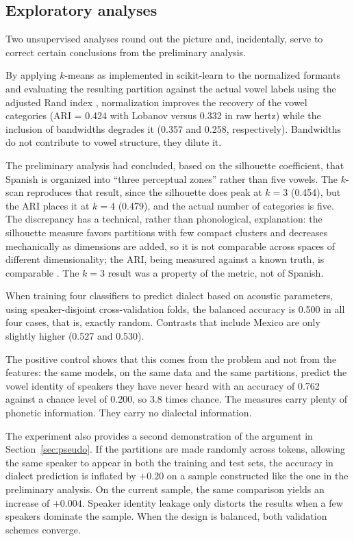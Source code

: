 \documentclass[11pt]{article}
\begin{document}
\subsection{Exploratory analyses}

Two unsupervised analyses round out the picture and, incidentally, serve to
correct certain conclusions from the preliminary analysis.

By applying $k$-means as implemented in scikit-learn \citep{pedregosa2011} to the
normalized formants and evaluating the resulting partition against the actual
vowel labels using the adjusted Rand index \citep{hubert1985}, normalization
improves the recovery of the vowel categories (ARI = 0.424 with Lobanov versus
0.332 in raw hertz) while the inclusion of bandwidths degrades it (0.357 and
0.258, respectively). Bandwidths do not contribute to vowel structure, they
dilute it.

The preliminary analysis had concluded, based on the silhouette coefficient, that
Spanish is organized into ``three perceptual zones'' rather than five vowels. The
$k$-scan reproduces that result, since the silhouette does peak at $k = 3$
(0.454), but the ARI places it at $k = 4$ (0.479), and the actual number of
categories is five. The discrepancy has a technical, rather than phonological, explanation:
the silhouette measure favors partitions with few compact clusters and decreases
mechanically as dimensions are added, so it is not comparable across spaces of
different dimensionality; the ARI, being measured against a known truth, is
comparable \citep{rousseeuw1987}. The $k = 3$ result was a property of the metric,
not of Spanish.

When training four classifiers to predict dialect based on acoustic parameters,
using speaker-disjoint cross-validation folds, the balanced accuracy is 0.500 in
all four cases, that is, exactly random. Contrasts that include Mexico are only
slightly higher (0.527 and 0.530).

The positive control shows that this comes from the problem and not from the
features: the same models, on the same data and the same partitions, predict the
vowel identity of speakers they have never heard with an accuracy of 0.762
against a chance level of 0.200, so 3.8 times chance. The measures carry plenty
of phonetic information. They carry no dialectal information.

The experiment also provides a second demonstration of the argument in
Section~\ref{sec:pseudo}. If the partitions are made randomly across tokens,
allowing the same speaker to appear in both the training and test sets, the
accuracy in dialect prediction is inflated by $+0.20$ on a sample constructed
like the one in the preliminary analysis. On the current sample, the same
comparison yields an increase of $+0.004$. Speaker identity leakage only distorts
the results when a few speakers dominate the sample. When the design is balanced,
both validation schemes converge.
\end{document}
